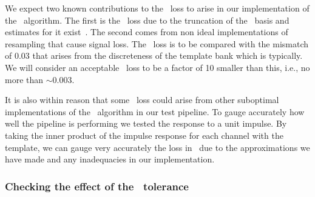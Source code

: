 We expect two known contributions to the \SNR\ loss to arise in our
implementation of the \lloid\ algorithm.  The first is the \SNR\ loss due to
the truncation of the \SVD\ basis and estimates for it
exist~\cite{Cannon:2010p10398}.  The second comes from non ideal
implementations of resampling that cause signal loss.  The \SNR\ loss is to be compared
with the mismatch of 0.03 that arises from the discreteness of the
template bank which is typically.  We will consider an acceptable
\SNR\ loss to be a factor of 10 smaller than this, i.e., no more than $\sim$0.003.

It is also within reason that some \SNR\ loss could arise from other suboptimal
implementations of the \lloid\ algorithm in our test pipeline.  To gauge
accurately how well the pipeline is performing we tested the response to a
unit impulse.  By taking the inner product of the impulse response for each channel
with the template, we can gauge very accurately the loss in
\SNR\ due to the approximations we have made and any inadequacies in
our implementation.

\subsubsection{Checking the effect of the \SVD\ tolerance}

